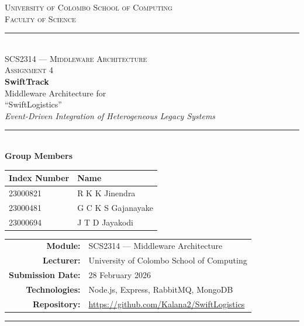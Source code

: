 \documentclass[12pt,a4paper]{article}
\begin{document}
\begin{titlepage}
  \centering
  \vspace*{1.5cm}
  
  {\large\textsc{University of Colombo School of Computing}}\\[0.3cm]
  {\normalsize\textsc{Faculty of Science}}\\[0.2cm]
  \rule{\textwidth}{0.5pt}\\[1.5cm]
  
  {\LARGE\textsc{SCS2314 --- Middleware Architecture}}\\[0.4cm]
  {\large\textsc{Assignment 4}}\\[1.5cm]
  
  {\Huge\bfseries\color{navy} SwiftTrack}\\[0.5cm]
  {\LARGE Middleware Architecture for\\``SwiftLogistics''}\\[0.3cm]
  {\large\textit{Event-Driven Integration of Heterogeneous Legacy Systems}}\\[2cm]
  
  \rule{0.6\textwidth}{0.3pt}\\[1cm]
  
  {\large\textbf{Group Members}}\\[0.5cm]
  
  \begin{tabular}{|l|l|}
    \hline
    \textbf{Index Number} & \textbf{Name} \\
    \hline
    23000821 & R K K Jinendra \\
    \hline
    23000481 & G C K S Gajanayake \\
    \hline
    23000694 & J T D Jayakodi \\
    \hline
  \end{tabular}
  
  \vfill
  
  \begin{tabular}{rl}
    \textbf{Module:} & SCS2314 --- Middleware Architecture \\
    \textbf{Lecturer:} & University of Colombo School of Computing \\
    \textbf{Submission Date:} & 28 February 2026 \\
    \textbf{Technologies:} & Node.js, Express, RabbitMQ, MongoDB \\
    \textbf{Repository:} & \url{https://github.com/Kalana2/SwiftLogistics} \\
  \end{tabular}
  
  \vspace{1cm}
  \rule{\textwidth}{0.5pt}
\end{titlepage}
\end{document}
